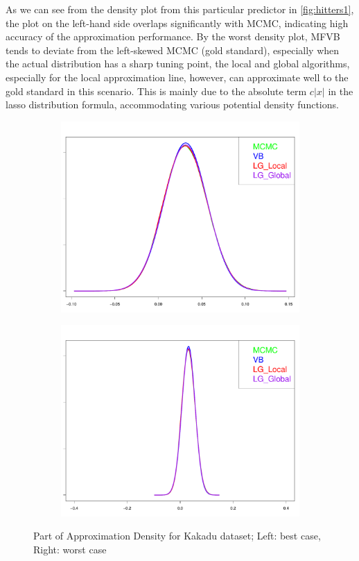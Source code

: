 As we can see from the density plot from this particular predictor in \autoref{fig:hitters1}, the plot on the left-hand side overlaps significantly with MCMC, indicating high accuracy of the approximation performance.
By the worst density plot, MFVB tends to deviate from the left-skewed MCMC (gold standard), especially when the actual distribution has a sharp tuning point, the local and global algorithms, especially for the local approximation line, however, can approximate well to the gold standard in this scenario. This is mainly due to the absolute term $c|x|$ in the lasso distribution formula, accommodating various potential density functions.\\
\begin{figure}[h]
	\begin{subfigure}{0.5\textwidth}
		\centering
		\includegraphics[page = 1, width=\linewidth,keepaspectratio]{lasso_densities_Kakadu.pdf}
	\end{subfigure}
	\begin{subfigure}{0.5\textwidth}
		\includegraphics[page = 2, width=\linewidth,keepaspectratio]{lasso_densities_Kakadu-1.pdf}
	\end{subfigure}
	\caption{Part of Approximation Density for Kakadu dataset; Left: best case, Right: worst case}
	\label{fig:Kakadu}
\end{figure}
